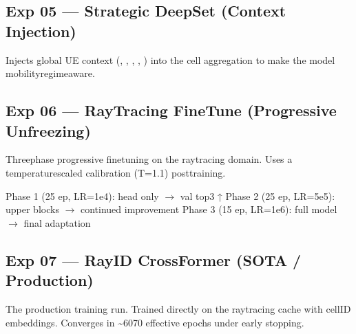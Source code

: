 \documentclass[letterpaper,10pt,english]{sphinxmanual}
\begin{document}
\sphinxAtStartPar
{}


\subsection{Exp 05 — Strategic DeepSet (Context Injection)}
\label{\detokenize{training:exp-05-strategic-deepset-context-injection}}
\sphinxAtStartPar
Injects global UE context (, , , , ) into the cell aggregation to make the model mobility\sphinxhyphen{}regime\sphinxhyphen{}aware.

\sphinxAtStartPar
{}


\subsection{Exp 06 — Ray\sphinxhyphen{}Tracing Fine\sphinxhyphen{}Tune (Progressive Unfreezing)}
\label{\detokenize{training:exp-06-ray-tracing-fine-tune-progressive-unfreezing}}
\sphinxAtStartPar
Three\sphinxhyphen{}phase progressive fine\sphinxhyphen{}tuning on the ray\sphinxhyphen{}tracing domain. Uses a temperature\sphinxhyphen{}scaled calibration (T=1.1) post\sphinxhyphen{}training.

\begin{sphinxVerbatim}[commandchars=\\\{\}]
Phase 1 (25 ep, LR=1e\PYGZhy{}4): head only   \(\rightarrow\) val top\PYGZhy{}3 ↑
Phase 2 (25 ep, LR=5e\PYGZhy{}5): upper blocks \(\rightarrow\) continued improvement
Phase 3 (15 ep, LR=1e\PYGZhy{}6): full model  \(\rightarrow\) final adaptation
\end{sphinxVerbatim}

\sphinxAtStartPar
{}


\subsection{Exp 07 — Ray\sphinxhyphen{}ID CrossFormer (SOTA / Production)}
\label{\detokenize{training:exp-07-ray-id-crossformer-sota-production}}
\sphinxAtStartPar
The production training run. Trained directly on the ray\sphinxhyphen{}tracing cache with cell\sphinxhyphen{}ID embeddings. Converges in \textasciitilde{}60\textendash{}70 effective epochs under early stopping.
\end{document}

